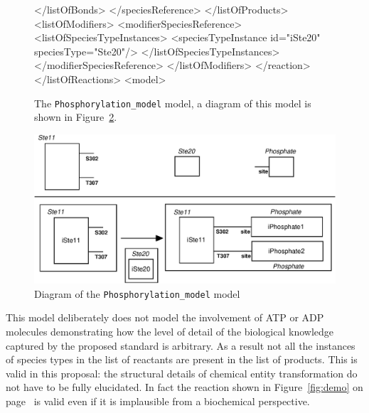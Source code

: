 \documentclass{cekarticle}
\begin{document}
\begin{figure}[h]
\begin{example}
                    </listOfBonds>
                </speciesReference>
            </listOfProducts>
            <listOfModifiers>
                <modifierSpeciesReference>
                    <listOfSpeciesTypeInstances>
                        <speciesTypeInstance id="iSte20" speciesType="Ste20"/>
                    </listOfSpeciesTypeInstances>
                </modifierSpeciesReference>
            </listOfModifiers>
        </reaction>
    </listOfReactions>
<model>
\end{example}
  \caption{The \texttt{Phosphorylation\_model} model, a diagram of this model is shown in
  Figure~\ref{fig:Phosphorylation_model}.}
  \label{fig:Phosphorylation_model-xml}
\end{figure}

\begin{figure}[h]
  \vspace*{8pt}
  \centering
  \includegraphics[scale = 0.7]{Phosphorylation-model.eps}
  \caption{Diagram of the \texttt{Phosphorylation\_model} model}
  \label{fig:Phosphorylation_model}
\end{figure}

This model deliberately does not model the involvement of ATP or ADP molecules demonstrating
how the level of detail of the biological knowledge captured by the proposed standard is arbitrary.
As a result not all the instances of species types in the list of reactants are present in the
list of products.  This is valid in this proposal: the structural details of chemical entity
transformation do not have to be fully elucidated.  In fact the reaction shown in
Figure~\ref{fig:demo} on page~\pageref{fig:demo} is valid even if it is implausible from a biochemical
perspective.
\end{document}
